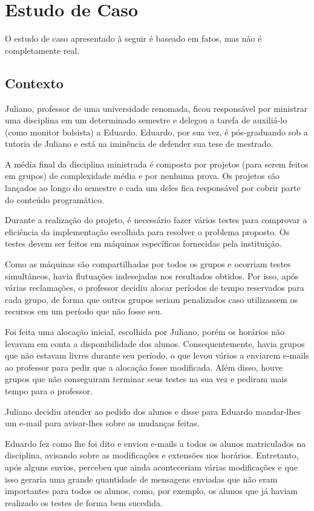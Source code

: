 \documentclass[a4paper,dvipdfm]{article}
\begin{document}
\newpage
\section{Estudo de Caso}
	O estudo de caso apresentado à seguir é baseado em fatos, mas não é completamente real. 

	\subsection{Contexto}	
    Juliano, professor de uma universidade renomada, ficou responsável por ministrar uma disciplina em um determinado semestre e delegou a tarefa de auxiliá-lo (como monitor bolsista) a Eduardo. 
	Eduardo, por sua vez, é pós-graduando sob a tutoria de Juliano e está na iminência de defender sua tese de mestrado.

    A média final da disciplina ministrada é composta por projetos (para serem feitos em grupos) de complexidade média e por nenhuma prova.
	Os projetos são lançados ao longo do semestre e cada um deles fica responsável por cobrir parte do conteúdo programático.

	Durante a realização do projeto, é necessário fazer vários testes para comprovar a eficiência da implementação escolhida para resolver o problema proposto. 
	Os testes devem ser feitos em máquinas específicas fornecidas pela instituição.
	
	Como as máquinas são compartilhadas por todos os grupos e ocorriam testes simultâneos, havia flutuações indesejadas nos resultados obtidos.
	Por isso, após várias reclamações, o professor decidiu alocar períodos de tempo reservados para cada grupo, de forma que outros grupos seriam penalizados caso utilizassem os recursos em um período que não fosse seu.

	Foi feita uma alocação inicial, escolhida por Juliano, porém os horários não levavam em conta a disponibilidade dos alunos. 
	Consequentemente, havia grupos que não estavam livres durante seu período, o que levou vários a enviarem e-mails ao professor para pedir que a alocação fosse modificada.
	Além disso, houve grupos que não conseguiram terminar seus testes na sua vez e pediram mais tempo para o professor.

	Juliano decidiu atender ao pedido dos alunos e disse para Eduardo mandar-lhes um e-mail para avisar-lhes sobre as mudanças feitas.
	
	Eduardo fez como lhe foi dito e enviou e-mails a todos os alunos matriculados na disciplina, avisando sobre as modificações e extensões nos horários.
	Entretanto, após alguns envios, percebeu que ainda aconteceriam várias modificações e que isso geraria uma grande quantidade de mensagens enviadas que não eram importantes para todos os alunos, como, por exemplo, os alunos que já haviam realizado os testes de forma bem sucedida.
\end{document}
